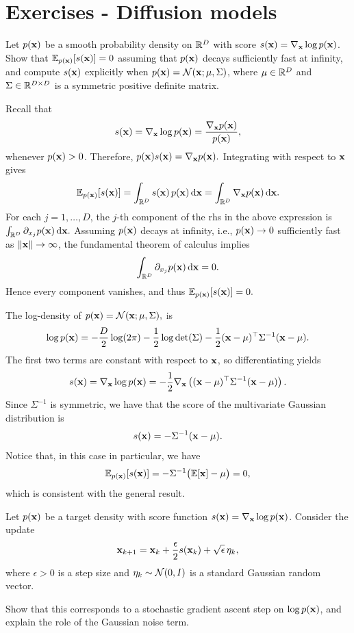 

\clearpage
\newpage
\section{Exercises - Diffusion models}

\begin{exercise}
Let $p({ \mathbf{x}})$ be a smooth probability density on ${\mathbb R}^D$ with score $s({ \mathbf{x}})=\nabla_{ \mathbf{x}} \log p({ \mathbf{x}})$.  
Show that $\mathbb{E}_{p({ \mathbf{x}})}[s({ \mathbf{x}})] = 0$ assuming that $p({ \mathbf{x}})$ decays sufficiently fast at infinity, and compute $s({ \mathbf{x}})$ explicitly when $p({ \mathbf{x}})={\mathcal N}({ \mathbf{x}};\mu,\Sigma)$, where $\mu\in{\mathbb R}^D$ and $\Sigma\in{\mathbb R}^{D\times D}$ is a symmetric positive definite matrix.
\end{exercise}

\begin{solution}
Recall that
\[
s({ \mathbf{x}})=\nabla_{ \mathbf{x}} \log p({ \mathbf{x}})=\frac{\nabla_{ \mathbf{x}} p({ \mathbf{x}})}{p({ \mathbf{x}})},
\]
whenever $p({ \mathbf{x}})>0$. Therefore,
\(
p({ \mathbf{x}})s({ \mathbf{x}})=\nabla_{ \mathbf{x}} p({ \mathbf{x}}).
\)
Integrating with respect to ${ \mathbf{x}}$ gives
\[
\mathbb{E}_{p({ \mathbf{x}})}[s({ \mathbf{x}})]
=
\int_{{\mathbb R}^D} s({ \mathbf{x}})\,p({ \mathbf{x}})\,{\text{d}}{ \mathbf{x}}
=
\int_{{\mathbb R}^D} \nabla_{ \mathbf{x}} p({ \mathbf{x}})\,{\text{d}}{ \mathbf{x}}.
\]
For each $j=1,\dots,D$, the $j$-th component of the rhs in the above expression is 
\(
\int_{{\mathbb R}^D} \partial_{x_j}p({ \mathbf{x}})\,{\text{d}}{ \mathbf{x}}.
\)
Assuming $p({ \mathbf{x}})$ decays at infinity, i.e.,  $p({ \mathbf{x}})\to 0$ sufficiently fast as $\|{ \mathbf{x}}\|\to\infty$, the fundamental theorem of calculus implies 
\[
\int_{{\mathbb R}^D} \partial_{x_j}p({ \mathbf{x}})\,{\text{d}}{ \mathbf{x}} = 0.
\]
Hence every component vanishes, and thus
\(
\mathbb{E}_{p({ \mathbf{x}})}[s({ \mathbf{x}})] = 0.
\)

The log-density of
\(
p({ \mathbf{x}})={\mathcal N}({ \mathbf{x}};\mu,\Sigma),
\)
is 
\[
\log p({ \mathbf{x}})
=
-\frac{D}{2}\log(2\pi)
-\frac{1}{2}\log\det(\Sigma)
-\frac{1}{2}({ \mathbf{x}}-\mu)^\top \Sigma^{-1}({ \mathbf{x}}-\mu).
\]
The first two terms are constant with respect to ${ \mathbf{x}}$, so differentiating yields
\[
s({ \mathbf{x}})=\nabla_{ \mathbf{x}} \log p({ \mathbf{x}})
=
-\frac{1}{2}\nabla_{ \mathbf{x}}\left(({ \mathbf{x}}-\mu)^\top \Sigma^{-1}({ \mathbf{x}}-\mu)\right).
\]
Since $\Sigma^{-1}$ is symmetric, we have that the score of the multivariate Gaussian distribution is 
\[
s({ \mathbf{x}})= -\Sigma^{-1}({ \mathbf{x}}-\mu).
\]
Notice that, in this case in particular, we have 
\[
\mathbb{E}_{p({ \mathbf{x}})}[s({ \mathbf{x}})]
=
-\Sigma^{-1}\bigl(\mathbb{E}[{ \mathbf{x}}]-\mu\bigr)
=0,
\]
which is consistent with the general result.
\end{solution}


\begin{exercise}
Let $p({ \mathbf{x}})$ be a target density with score function $s({ \mathbf{x}})=\nabla_{ \mathbf{x}} \log p({ \mathbf{x}})$.  
Consider the update
\[
{ \mathbf{x}}_{k+1} = { \mathbf{x}}_k + \frac{\epsilon}{2}s({ \mathbf{x}}_k) + \sqrt{\epsilon}\,\eta_k,
\]
where $\epsilon>0$ is a step size and $\eta_k\sim{\mathcal N}(0,I)$ is a standard Gaussian random vector.

Show that this corresponds to a stochastic gradient ascent step on $\log p({ \mathbf{x}})$, and explain the role of the Gaussian noise term.
\end{exercise}

